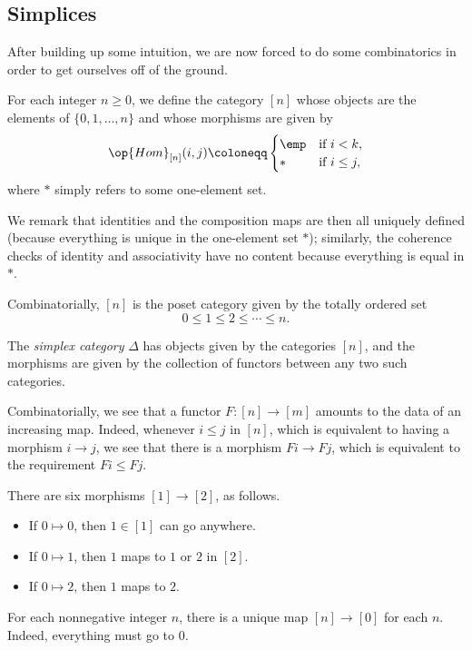 \documentclass[../notes.tex]{subfiles}
\begin{document}
\subsection{Simplices}
After building up some intuition, we are now forced to do some combinatorics in order to get ourselves off of the ground.
\begin{notation}
	For each integer $n\ge0$, we define the category $[n]$ whose objects are the elements of $\{0,1,\ldots,n\}$ and whose morphisms are given by
	\[\op{Hom}_{[n]}(i,j)\coloneqq\begin{cases}
		\emp & \text{if }i<k, \\
		* & \text{if }i\le j,
	\end{cases}\]
	where $*$ simply refers to some one-element set.
\end{notation}
We remark that identities and the composition maps are then all uniquely defined (because everything is unique in the one-element set $*$); similarly, the coherence checks of identity and associativity have no content because everything is equal in $*$.
\begin{remark}
	Combinatorially, $[n]$ is the poset category given by the totally ordered set
	\[0\le 1\le2\le\cdots\le n.\]
\end{remark}
\begin{definition}[simplex]
	The \textit{simplex category} $\Delta$ has objects given by the categories $[n]$, and the morphisms are given by the collection of functors between any two such categories.
\end{definition}
\begin{remark}
	Combinatorially, we see that a functor $F\colon[n]\to[m]$ amounts to the data of an increasing map. Indeed, whenever $i\le j$ in $[n]$, which is equivalent to having a morphism $i\to j$, we see that there is a morphism $Fi\to Fj$, which is equivalent to the requirement $Fi\le Fj$.
\end{remark}
\begin{example}
	There are six morphisms $[1]\to[2]$, as follows.
	\begin{itemize}
		\item If $0\mapsto0$, then $1\in[1]$ can go anywhere.
		\item If $0\mapsto1$, then $1$ maps to $1$ or $2$ in $[2]$.
		\item If $0\mapsto2$, then $1$ maps to $2$.
	\end{itemize}
\end{example}
\begin{example}
	For each nonnegative integer $n$, there is a unique map $[n]\to[0]$ for each $n$. Indeed, everything must go to $0$.
\end{example}
\end{document}
